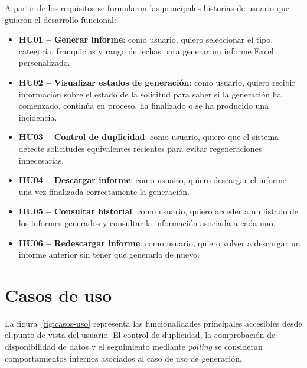 \documentclass[11pt,a4paper,titlepage,oneside]{report}
\begin{document}
A partir de los requisitos se formularon las principales historias de usuario
que guiaron el desarrollo funcional:

\begin{itemize}

    \item \textbf{HU01 -- Generar informe}: como usuario, quiero seleccionar el
    tipo, categoría, franquicias y rango de fechas para generar un informe Excel
    personalizado.

    \item \textbf{HU02 -- Visualizar estados de generación}: como usuario,
    quiero recibir información sobre el estado de la solicitud para saber si la
    generación ha comenzado, continúa en proceso, ha finalizado o se ha
    producido una incidencia.

    \item \textbf{HU03 -- Control de duplicidad}: como usuario, quiero que el
    sistema detecte solicitudes equivalentes recientes para evitar
    regeneraciones innecesarias.

    \item \textbf{HU04 -- Descargar informe}: como usuario, quiero descargar el
    informe una vez finalizada correctamente la generación.

    \item \textbf{HU05 -- Consultar historial}: como usuario, quiero acceder a
    un listado de los informes generados y consultar la información asociada a
    cada uno.

    \item \textbf{HU06 -- Redescargar informe}: como usuario, quiero volver a
    descargar un informe anterior sin tener que generarlo de nuevo.

\end{itemize}

\section{Casos de uso}

La figura~\ref{fig:casos-uso} representa las funcionalidades principales
accesibles desde el punto de vista del usuario. El control de duplicidad, la
comprobación de disponibilidad de datos y el seguimiento mediante
\textit{polling} se consideran comportamientos internos asociados al caso de
uso de generación.
\end{document}
